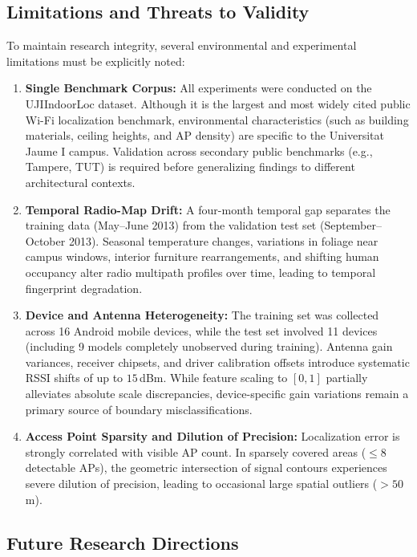 \subsection{Limitations and Threats to Validity}

To maintain research integrity, several environmental and experimental limitations must be explicitly noted:

\begin{enumerate}
    \item \textbf{Single Benchmark Corpus:} 
    All experiments were conducted on the UJIIndoorLoc dataset. Although it is the largest and most widely cited public Wi-Fi localization benchmark, environmental characteristics (such as building materials, ceiling heights, and AP density) are specific to the Universitat Jaume I campus. Validation across secondary public benchmarks (e.g., Tampere, TUT) is required before generalizing findings to different architectural contexts.
    
    \item \textbf{Temporal Radio-Map Drift:} 
    A four-month temporal gap separates the training data (May--June 2013) from the validation test set (September--October 2013). Seasonal temperature changes, variations in foliage near campus windows, interior furniture rearrangements, and shifting human occupancy alter radio multipath profiles over time, leading to temporal fingerprint degradation.
    
    \item \textbf{Device and Antenna Heterogeneity:} 
    The training set was collected across 16 Android mobile devices, while the test set involved 11 devices (including 9 models completely unobserved during training). Antenna gain variances, receiver chipsets, and driver calibration offsets introduce systematic RSSI shifts of up to $15$\,dBm. While feature scaling to $[0, 1]$ partially alleviates absolute scale discrepancies, device-specific gain variations remain a primary source of boundary misclassifications.
    
    \item \textbf{Access Point Sparsity and Dilution of Precision:} 
    Localization error is strongly correlated with visible AP count. In sparsely covered areas ($\le 8$ detectable APs), the geometric intersection of signal contours experiences severe dilution of precision, leading to occasional large spatial outliers ($>50$\,m).
\end{enumerate}

\subsection{Future Research Directions}

